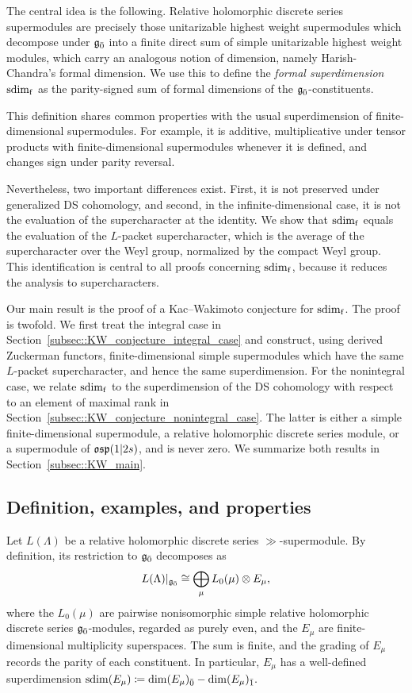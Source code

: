 The central idea is the following. Relative holomorphic discrete series supermodules are precisely those unitarizable highest weight supermodules which decompose under ${\mathfrak{g}_{\bar{0}}}$ into a finite direct sum of simple unitarizable highest weight modules, which carry an analogous notion of dimension, namely Harish-Chandra's formal dimension. We use this to define the \emph{formal superdimension} $\operatorname{sdim}_{\mathrm f}$ as the parity-signed sum of formal dimensions of the ${\mathfrak{g}_{\bar{0}}}$-constituents.  

This definition shares common properties with the usual superdimension of finite-dimensional supermodules. For example, it is additive, multiplicative under tensor products with finite-dimensional supermodules whenever it is defined, and changes sign under parity reversal. 

Nevertheless, two important differences exist. First, it is not preserved under generalized DS cohomology, and second, in the infinite-dimensional case, it is not the evaluation of the supercharacter at the identity. We show that $\operatorname{sdim}_{\mathrm f}$ equals the evaluation of the $L$-packet supercharacter, which is the average of the supercharacter over the Weyl group, normalized by the compact Weyl group. This identification is central to all proofs concerning $\operatorname{sdim}_{\mathrm f}$, because it reduces the analysis to supercharacters.  

Our main result is the proof of a Kac--Wakimoto conjecture for $\operatorname{sdim}_{\mathrm f}$. The proof is twofold. We first treat the integral case in Section~\ref{subsec::KW_conjecture_integral_case} and construct, using derived Zuckerman functors, finite-dimensional simple supermodules which have the same $L$-packet supercharacter, and hence the same superdimension. For the nonintegral case, we relate $\operatorname{sdim}_{\mathrm f}$ to the superdimension of the DS cohomology with respect to an element of maximal rank in Section~\ref{subsec::KW_conjecture_nonintegral_case}. The latter is either a simple finite-dimensional supermodule, a relative holomorphic discrete series module, or a supermodule of ${\mathfrak{osp}}(1\vert 2s)$, and is never zero. We summarize both results in Section~\ref{subsec::KW_main}.

\subsection{Definition, examples, and properties}\label{subsec::formal_superdimension}
Let $L(\Lambda)$ be a relative holomorphic discrete series $\gg$-supermodule. By definition, its restriction to ${\mathfrak{g}_{\bar{0}}}$ decomposes as
\begin{equation}
L(\Lambda)|_{{\mathfrak{g}_{\bar{0}}}} \cong \bigoplus_\mu L_0(\mu)\otimes E_\mu,
\end{equation}
where the $L_0(\mu)$ are pairwise nonisomorphic simple relative holomorphic discrete series ${\mathfrak{g}_{\bar{0}}}$-modules, regarded as purely even, and the $E_\mu$ are finite-dimensional multiplicity superspaces. The sum is finite, and the grading of $E_\mu$ records the parity of each constituent. In particular, $E_{\mu}$ has a well-defined superdimension $\operatorname{sdim}(E_\mu)
\coloneqq
\dim(E_\mu)_{\bar0}-\dim(E_\mu)_{\bar1}.$

